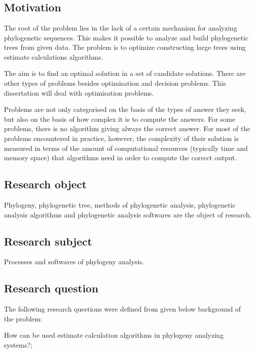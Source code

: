 \section*{}
\subsection*{Motivation}
The root of the problem lies in the lack of a certain mechanism 
for analyzing phylogenetic sequences. This makes it possible to 
analyze and build phylogenetic trees from given data. The problem 
is to optimize constructing large trees using estimate 
calculations algorithms.

The aim is to find an optimal solution in a set of candidate solutions. 
There are other types of problems besides optimisation and decision problems. 
This dissertation will deal with optimisation problems.

Problems are not only categorised on the basis of the types of 
answer they seek, but also on the basis of how complex it is to 
compute the answers. For some problems, there is no algorithm 
giving always the correct answer. For most of the problems 
encountered in practice, however, the complexity of their 
solution is measured in terms of the amount of computational 
resources (typically time and memory space) that algorithms need 
in order to compute the correct output.

\subsection*{Research object}
Phylogeny, phylogenetic tree, methods of phylogenetic analysis,
phylogenetic analysis algorithms and phylogenetic analysis
softwares are the object of research. 

\subsection*{Research subject}
Processes and softwares of phylogeny analysis.

\subsection*{Research question} 

The following research questions were defined from given below 
background of the problem:

How can be used estimate calculation algorithms in phylogeny 
analyzing systems?;

